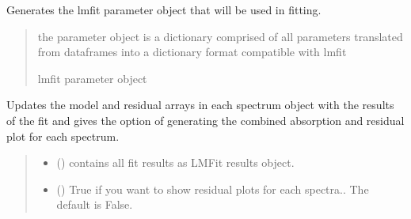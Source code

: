 \documentclass[letterpaper,10pt,english]{sphinxmanual}
\begin{document}
\begin{fulllineitems}
\begin{fulllineitems}
\label{\detokenize{MATS:MATS.fit_dataset.Fit_DataSet.generate_params}}
\pysigstartsignatures
{}
\pysigstopsignatures
\sphinxAtStartPar
Generates the lmfit parameter object that will be used in fitting.
\begin{quote}\begin{description}
\sphinxAtStartPar
{} \textendash{} the parameter object is a dictionary comprised of all parameters translated from dataframes into a dictionary format compatible with lmfit

\sphinxAtStartPar
lmfit parameter object

\end{description}\end{quote}

\end{fulllineitems}


\begin{fulllineitems}
\label{\detokenize{MATS:MATS.fit_dataset.Fit_DataSet.residual_analysis}}
\pysigstartsignatures
{}
\pysigstopsignatures
\sphinxAtStartPar
Updates the model and residual arrays in each spectrum object with the results of the fit and gives the option of generating the combined absorption and residual plot for each spectrum.
\begin{quote}\begin{description}
\begin{itemize}
\item {} 
\sphinxAtStartPar
{} () \textendash{} contains all fit results as LMFit results object.

\item {} 
\sphinxAtStartPar
{} (\sphinxstyleliteralemphasis{\sphinxupquote{, }}) \textendash{} True if you want to show residual plots for each spectra.. The default is False.


\end{itemize}
\end{description}
\end{quote}
\end{fulllineitems}
\end{fulllineitems}
\end{document}
